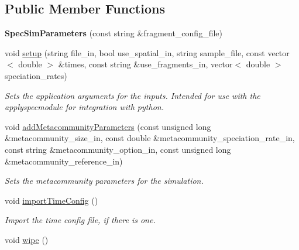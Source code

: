 \subsection*{Public Member Functions}
\begin{DoxyCompactItemize}
\item 
{\bfseries Spec\+Sim\+Parameters} (const string \&fragment\+\_\+config\+\_\+file)\hypertarget{struct_spec_sim_parameters_af952a8e5648dfcd7edeb09e2817bf5bc}{}\label{struct_spec_sim_parameters_af952a8e5648dfcd7edeb09e2817bf5bc}

\item 
void \hyperlink{struct_spec_sim_parameters_a8ccea55b45c88fec3c1ff43a4ce81279}{setup} (string file\+\_\+in, bool use\+\_\+spatial\+\_\+in, string sample\+\_\+file, const vector$<$ double $>$ \&times, const string \&use\+\_\+fragments\+\_\+in, vector$<$ double $>$ speciation\+\_\+rates)
\begin{DoxyCompactList}\small\item\em Sets the application arguments for the inputs. Intended for use with the applyspecmodule for integration with python. \end{DoxyCompactList}\item 
void \hyperlink{struct_spec_sim_parameters_af7213e036e74c8c6e7e1b8c2a8016b02}{add\+Metacommunity\+Parameters} (const unsigned long \&metacommunity\+\_\+size\+\_\+in, const double \&metacommunity\+\_\+speciation\+\_\+rate\+\_\+in, const string \&metacommunity\+\_\+option\+\_\+in, const unsigned long \&metacommunity\+\_\+reference\+\_\+in)
\begin{DoxyCompactList}\small\item\em Sets the metacommunity parameters for the simulation. \end{DoxyCompactList}\item 
void \hyperlink{struct_spec_sim_parameters_ae0196a50a551a821b75b6e92a35534a7}{import\+Time\+Config} ()\hypertarget{struct_spec_sim_parameters_ae0196a50a551a821b75b6e92a35534a7}{}\label{struct_spec_sim_parameters_ae0196a50a551a821b75b6e92a35534a7}

\begin{DoxyCompactList}\small\item\em Import the time config file, if there is one. \end{DoxyCompactList}\item 
void \hyperlink{struct_spec_sim_parameters_a10aac8e7ab592f53b071287e60483b88}{wipe} ()\hypertarget{struct_spec_sim_parameters_a10aac8e7ab592f53b071287e60483b88}{}\label{struct_spec_sim_parameters_a10aac8e7ab592f53b071287e60483b88}


\end{DoxyCompactItemize}
